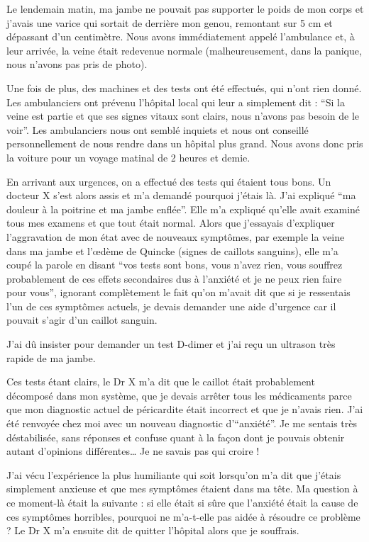 Le lendemain matin, ma jambe ne pouvait pas supporter le poids de mon corps et
j'avais une varice qui sortait de derrière mon genou, remontant sur 5 cm et
dépassant d'un centimètre. Nous avons immédiatement appelé l'ambulance et, à
leur arrivée, la veine était redevenue normale (malheureusement, dans la
panique, nous n'avons pas pris de photo).

Une fois de plus, des machines et des tests ont été effectués, qui n'ont rien
donné. Les ambulanciers ont prévenu l'hôpital local qui leur a simplement dit :
“Si la veine est partie et que ses signes vitaux sont clairs, nous n'avons pas
besoin de le voir”. Les ambulanciers nous ont semblé inquiets et nous ont
conseillé personnellement de nous rendre dans un hôpital plus grand. Nous avons
donc pris la voiture pour un voyage matinal de 2 heures et demie.

En arrivant aux urgences, on a effectué des tests qui étaient tous bons. Un
docteur X s'est alors assis et m'a demandé pourquoi j'étais là. J'ai expliqué
“ma douleur à la poitrine et ma jambe enflée”. Elle m'a expliqué qu'elle avait
examiné tous mes examens et que tout était normal. Alors que j'essayais
d'expliquer l'aggravation de mon état avec de nouveaux symptômes, par exemple la
veine dans ma jambe et l'œdème de Quincke (signes de caillots sanguins), elle
m'a coupé la parole en disant “vos tests sont bons, vous n'avez rien, vous
souffrez probablement de ces effets secondaires dus à l'anxiété et je ne peux
rien faire pour vous”, ignorant complètement le fait qu'on m'avait dit que si je
ressentais l'un de ces symptômes actuels, je devais demander une aide d'urgence
car il pouvait s'agir d'un caillot sanguin.

J'ai dû insister pour demander un test D-dimer et j'ai reçu un ultrason très
rapide de ma jambe.

Ces tests étant clairs, le Dr X m'a dit que le caillot était probablement
décomposé dans mon système, que je devais arrêter tous les médicaments parce que
mon diagnostic actuel de péricardite était incorrect et que je n'avais
rien. J'ai été renvoyée chez moi avec un nouveau diagnostic d'“anxiété”. Je me
sentais très déstabilisée, sans réponses et confuse quant à la façon dont je
pouvais obtenir autant d'opinions différentes… Je ne savais pas qui croire !

J'ai vécu l'expérience la plus humiliante qui soit lorsqu'on m'a dit que j'étais
simplement anxieuse et que mes symptômes étaient dans ma tête. Ma question à ce
moment-là était la suivante : si elle était si sûre que l'anxiété était la cause
de ces symptômes horribles, pourquoi ne m'a-t-elle pas aidée à résoudre ce
problème ? Le Dr X m'a ensuite dit de quitter l'hôpital alors que je souffrais.

